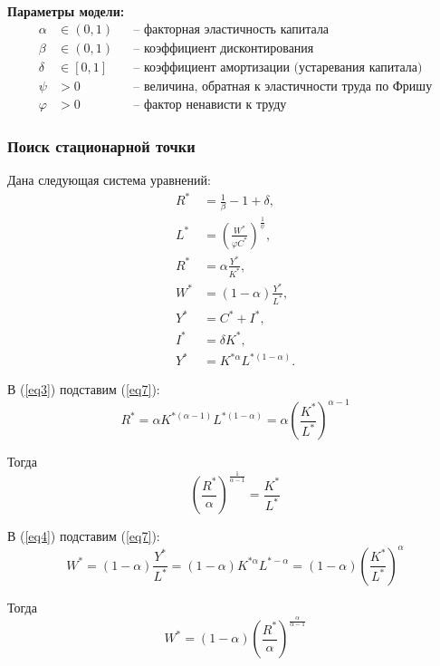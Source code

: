 \documentclass[a4paper,12pt]{article}
\begin{document}
{\noindent\textbf{Параметры модели:}
\begin{align*}
    \alpha &\in (0,1)    &&\text{-- факторная эластичность капитала} \\
    \beta  &\in (0,1)   &&\text{-- коэффициент дисконтирования} \\
    \delta &\in [0,1]   &&\text{-- коэффициент амортизации (устаревания капитала)} \\
    \psi    &> 0      &&\text{-- величина, обратная к эластичности труда по Фришу} \\
    \varphi &> 0      &&\text{-- фактор ненависти к труду}
\end{align*}

\subsubsection{Поиск стационарной точки}
Дана следующая система уравнений:
\begin{align}
    R^* &= \frac{1}{\beta} - 1 + \delta, \label{eq1} \\
    L^* &= \left( \frac{W^*}{\varphi C^*} \right)^{\frac{1}{\psi}}, \label{eq2} \\
    R^* &= \alpha \frac{Y^*}{K^*}, \label{eq3} \\
    W^* &= (1-\alpha) \frac{Y^*}{L^*}, \label{eq4} \\
    Y^* &= C^* + I^*, \label{eq5} \\
    I^* &= \delta K^*, \label{eq6} \\
    Y^* &= K^{* \alpha} L^{* (1-\alpha)}. \label{eq7}
\end{align}

В (\ref{eq3}) подставим (\ref{eq7}):
\begin{equation*}
    R^* = \alpha K^{*(\alpha - 1)} L^{*(1- \alpha)} = \alpha \left(\frac{K^*}{L^*} \right)^{\alpha - 1} 
\end{equation*}

Тогда 
\begin{equation*}
    \left(\frac{R^*}{\alpha}\right)^{\frac{1}{\alpha - 1}} = \frac{K^*}{L^*}  
\end{equation*}

В (\ref{eq4}) подставим (\ref{eq7}):
\begin{equation*}
    W^* = (1-\alpha) \frac{Y^*}{L^*} = (1-\alpha) K^{*\alpha}L^{*-\alpha} = (1-\alpha)\left(\frac{K^*}{L^*}\right)^{\alpha} 
\end{equation*}

Тогда 
\begin{equation*}
    W^* = (1-\alpha) \left(\frac{R^*}{\alpha}\right)^{\frac{\alpha}{\alpha - 1}}
\end{equation*}

}
\end{document}
